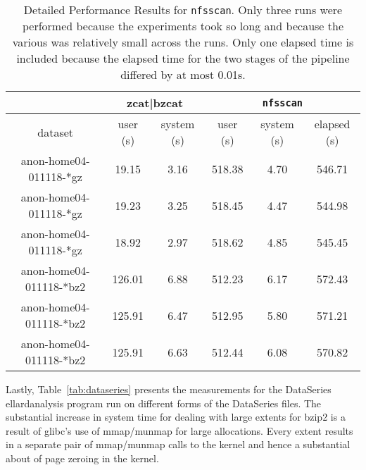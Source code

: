 \begin{table}
\begin{tabular}{|c|c|c|c|c|c|} \hline
& \multicolumn{2}{c|}{zcat|bzcat} & \multicolumn{3}{c|}{\texttt{nfsscan}} \\ \hline
 dataset & user (s) & system (s) & user (s)& system (s)& elapsed (s)\\ \hline

anon-home04-011118-*gz  & 19.15  & 3.16 & 518.38 & 4.70 & 546.71 \\
anon-home04-011118-*gz  & 19.23  & 3.25 & 518.45 & 4.47 & 544.98 \\
anon-home04-011118-*gz  & 18.92  & 2.97 & 518.62 & 4.85 & 545.45 \\

anon-home04-011118-*bz2 & 126.01 & 6.88 & 512.23 & 6.17 & 572.43 \\
anon-home04-011118-*bz2 & 125.91 & 6.47 & 512.95 & 5.80 & 571.21 \\
anon-home04-011118-*bz2 & 125.91 & 6.63 & 512.44 & 6.08 & 570.82 \\ \hline
\end{tabular}
\label{tab:nfsscan}

\caption{Detailed Performance Results for \texttt{nfsscan}.  Only
three runs were performed because the experiments took so long and
because the various was relatively small across the runs.  Only one
elapsed time is included because the elapsed time for the two stages
of the pipeline differed by at most 0.01s.}

\end{table}

Lastly, Table~\ref{tab:dataseries} presents the measurements for the
DataSeries ellardanalysis program run on different forms of the
DataSeries files.  The substantial increase in system time for dealing
with large extents for bzip2 is a result of glibc's use of mmap/munmap
for large allocations.  Every extent results in a separate pair of
mmap/munmap calls to the kernel and hence a substantial about of page
zeroing in the kernel.

